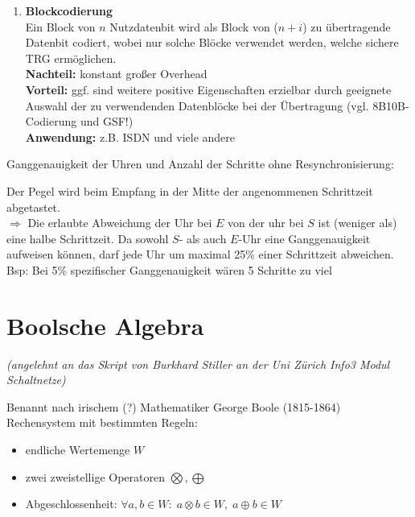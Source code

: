 \documentclass[10pt,a4paper]{scrartcl}
\begin{document}
\begin{enumerate}
	\item \textbf{Blockcodierung}\\
	Ein Block von $n$ Nutzdatenbit wird als Block von ($n+i$) zu übertragende Datenbit codiert, wobei nur solche Blöcke verwendet werden, welche sichere \ac{TRG} ermöglichen.
	\\[0.25em]
	\textbf{Nachteil:} konstant großer Overhead
	\\[0.25em]
	\textbf{Vorteil:} ggf. sind weitere positive Eigenschaften erzielbar durch geeignete Auswahl der zu verwendenden Datenblöcke bei der Übertragung (vgl. 8B10B-Codierung und \ac{GSF}!)
	\\[0.25em]
	\textbf{Anwendung:} z.B. ISDN und viele andere
\end{enumerate}

Ganggenauigkeit der Uhren und Anzahl der Schritte ohne Resynchronisierung:
\begin{center}
\end{center}
Der Pegel wird beim Empfang in der Mitte der angenommenen Schrittzeit abgetastet.\\
\hspace*{1em} $\Rightarrow$ Die erlaubte Abweichung der Uhr bei $E$ von der uhr bei $S$ ist (weniger als) eine halbe Schrittzeit. Da sowohl $S$- als auch $E$-Uhr eine Ganggenauigkeit aufweisen können, darf jede Uhr um maximal 25\% einer Schrittzeit abweichen.\\[0.5em]
Bsp: Bei 5\% spezifischer Ganggenauigkeit wären 5 Schritte \glqq zu viel\grqq

\newpage
\section{Boolsche Algebra}
\begin{center}
	\textit{(angelehnt an das Skript von Burkhard Stiller an der Uni Zürich \glqq Info3 Modul Schaltnetze\grqq)
}
\end{center}
Benannt nach irischem (?) Mathematiker George Boole (1815-1864)\\
Rechensystem mit bestimmten Regeln:
\begin{itemize}
\item endliche Wertemenge $W$
\item zwei zweistellige Operatoren $\bigotimes, \bigoplus$
\item Abgeschlossenheit: $\forall a, b \in W\!: \; a \otimes  b \in W, \; a \oplus b \in W$
\end{itemize}
\end{document}
